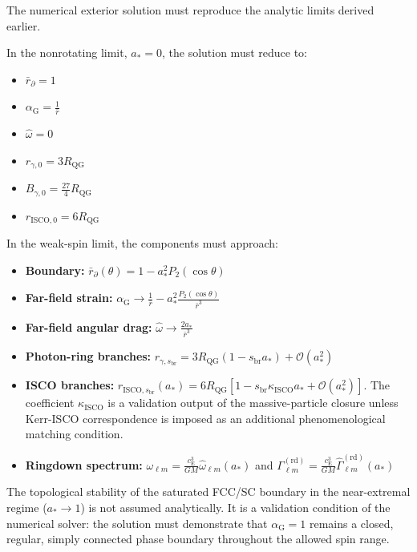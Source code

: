 The numerical exterior solution must reproduce the analytic limits derived earlier.

In the nonrotating limit, $a_\ast=0$, the solution must reduce to:
\begin{itemize}
    \item $\bar{r}_{\partial}=1$
    \item $\alpha_{\mathrm{G}}=\frac{1}{\bar{r}}$
    \item $\widehat{\omega}=0$
    \item $r_{\gamma,0}=3R_{\mathrm{QG}}$
    \item $B_{\gamma,0} = \frac{27}{4}R_{\mathrm{QG}}$
    \item $r_{\mathrm{ISCO},0} = 6R_{\mathrm{QG}}$
\end{itemize}

In the weak-spin limit, the components must approach:
\begin{itemize}
    \item \textbf{Boundary:} $\bar{r}_{\partial}(\theta) = 1 - a_\ast^2P_2(\cos\theta)$
    \item \textbf{Far-field strain:} $\alpha_{\mathrm{G}} \rightarrow \frac{1}{\bar{r}} - a_\ast^2 \frac{P_2(\cos\theta)}{\bar{r}^3}$
    \item \textbf{Far-field angular drag:} $\widehat{\omega} \rightarrow \frac{2a_\ast}{\bar{r}^3}$
    \item \textbf{Photon-ring branches:} $r_{\gamma,s_{\mathrm{br}}} = 3R_{\mathrm{QG}} (1-s_{\mathrm{br}} a_\ast) + \mathcal{O}(a_\ast^2)$
    \item \textbf{ISCO branches:} $r_{\mathrm{ISCO},s_{\mathrm{br}}}(a_\ast) = 6R_{\mathrm{QG}} \left[ 1 - s_{\mathrm{br}}\kappa_{\mathrm{ISCO}}a_\ast + \mathcal{O}(a_\ast^2) \right]$. The coefficient $\kappa_{\mathrm{ISCO}}$ is a validation output of the massive-particle closure unless Kerr-ISCO correspondence is imposed as an additional phenomenological matching condition.
    \item \textbf{Ringdown spectrum:} $\omega_{\ell m} = \frac{c_{\mathrm{E}}^3}{GM} \widehat{\omega}_{\ell m}(a_\ast)$ and $\Gamma_{\ell m}^{(\mathrm{rd})} = \frac{c_{\mathrm{E}}^3}{GM} \widehat{\Gamma}_{\ell m}^{(\mathrm{rd})}(a_\ast)$
\end{itemize}

The topological stability of the saturated FCC/SC boundary in the near-extremal regime ($a_\ast \rightarrow 1$) is not assumed analytically. It is a validation condition of the numerical solver: the solution must demonstrate that $\alpha_{\mathrm{G}}=1$ remains a closed, regular, simply connected phase boundary throughout the allowed spin range.

